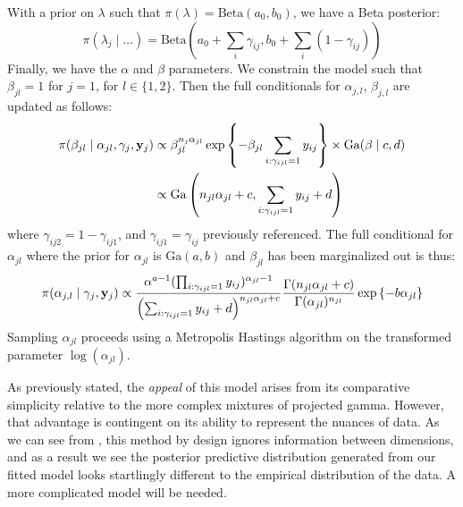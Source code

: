 With a prior on $\lambda$ such that $\pi(\lambda) = \text{Beta}(a_0,b_0)$, we
  have a Beta posterior:
\begin{equation*}
\pi(\lambda_j\mid\ldots) = \text{Beta}\left(a_0 + \sum_i\gamma_{ij}, b_0 + \sum_i(1 - \gamma_{ij})\right)
\end{equation*}
Finally, we have the $\alpha$ and $\beta$ parameters.  We constrain the model
  such that $\beta_{jl} = 1$ for $j = 1$, for $l \in \lbrace 1, 2\rbrace$.  Then
  the full conditionals for $\alpha_{j,l}$, $\beta_{j,l}$ are updated as follows:
\begin{equation*}
  \begin{aligned}
    \pi(\beta_{jl}\mid\alpha_{jl},{\bf \gamma}_j,{\bf y}_j) &\propto \beta_{jl}^{n_j\alpha_{jl}}\exp\left\lbrace-\beta_{jl}\sum_{i:\gamma_{ijl} = 1}y_{ij}\right\rbrace\times\text{Ga}(\beta\mid c,d)\\
    &\propto \text{Ga}\left(n_{jl}\alpha_{jl} + c, \sum_{i:\gamma_{ijl} = 1}y_{ij} + d\right)
  \end{aligned}
\end{equation*}
where $\gamma_{ij2} = 1 - \gamma_{ij1}$, and $\gamma_{ij1} = \gamma_{ij}$
  previously referenced.  The full conditional for $\alpha_{jl}$ where the
  prior for $\alpha_{jl}$ is $\text{Ga}(a,b)$ and $\beta_{jl}$  has been
  marginalized out is thus:
\begin{equation*}
  \pi(\alpha_{j,l}\mid{\bf \gamma}_j,{\bf y}_j) \propto \frac{\alpha^{a - 1}(\prod_{i:\gamma_{ijl} = 1}y_{ij})^{\alpha_{jl} - 1}}{\left(\sum_{i:\gamma_{ijl} = 1}y_{ij} + d\right)^{n_{jl}\alpha_{jl} + c}}\frac{\Gamma(n_{jl}\alpha_{jl} + c)}{\Gamma(\alpha_{jl})^{n_{jl}}}\exp\left\lbrace-b\alpha_{jl}\right\rbrace
\end{equation*}
Sampling $\alpha_{jl}$ proceeds using a Metropolis Hastings algorithm on the
  transformed parameter $\log(\alpha_{jl})$.

As previously stated, the \emph{appeal} of this model arises from its comparative
  simplicity relative to the more complex mixtures of projected gamma.  However,
  that advantage is contingent on its ability to represent the nuances of data.
  As we can see from , this method by design ignores
  information between dimensions, and as a result we see the posterior predictive
  distribution generated from our fitted model looks startlingly different to the
  empirical distribution of the data.  A more complicated model will be needed.











